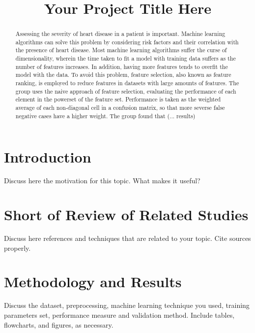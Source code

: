 \documentclass[conference]{IEEEtran}
\begin{document}
\title{Your Project Title Here}

\author{
}

\maketitle

\begin{abstract}
	Assessing the severity of heart disease in a patient is important.
	Machine learning algorithms can solve this problem by considering risk factors and their correlation with the presence of heart disease.
	Most machine learning algorithms suffer the curse of dimensionality, wherein the time taken to fit a model with training data suffers as the number of features increases.
	In addition, having more features tends to overfit the model with the data.
	To avoid this problem, feature selection, also known as feature ranking, is employed to reduce features in datasets with large amounts of features.
	The group uses the naive approach of feature selection, evaluating the performance of each element in the powerset of the feature set.
	Performance is taken as the weighted average of each non-diagonal cell in a confusion matrix, so that more severse false negative cases have a higher weight.
	The group found that (... results)
\end{abstract}

\section{Introduction}
Discuss here the motivation for this topic. What makes it useful?
\section{Short of Review of Related Studies}
Discuss here references and techniques that are related to your topic. Cite sources properly.
\section{Methodology and Results}
Discuss the dataset, preprocessing, machine learning technique you used, training parameters set, performance measure and validation method.
Include tables, flowcharts, and figures, as necessary.
\end{document}
